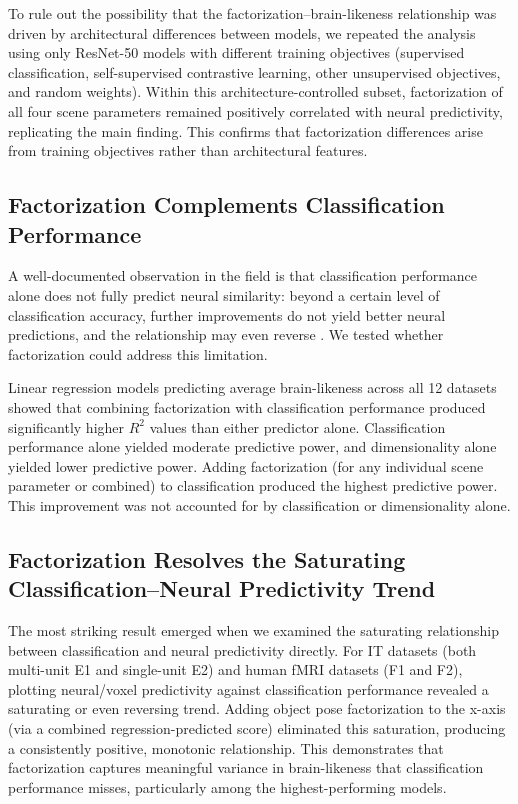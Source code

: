 \documentclass[11pt]{article}
\begin{document}
To rule out the possibility that the factorization--brain-likeness relationship was driven by architectural differences between models, we repeated the analysis using only ResNet-50 models with different training objectives (supervised classification, self-supervised contrastive learning, other unsupervised objectives, and random weights). Within this architecture-controlled subset, factorization of all four scene parameters remained positively correlated with neural predictivity, replicating the main finding. This confirms that factorization differences arise from training objectives rather than architectural features.

\subsection{Factorization Complements Classification Performance}

A well-documented observation in the field is that classification performance alone does not fully predict neural similarity: beyond a certain level of classification accuracy, further improvements do not yield better neural predictions, and the relationship may even reverse \citep{schrimpf2018}. We tested whether factorization could address this limitation.

Linear regression models predicting average brain-likeness across all 12 datasets showed that combining factorization with classification performance produced significantly higher $R^2$ values than either predictor alone. Classification performance alone yielded moderate predictive power, and dimensionality alone yielded lower predictive power. Adding factorization (for any individual scene parameter or combined) to classification produced the highest predictive power. This improvement was not accounted for by classification or dimensionality alone.

\subsection{Factorization Resolves the Saturating Classification--Neural Predictivity Trend}

The most striking result emerged when we examined the saturating relationship between classification and neural predictivity directly. For IT datasets (both multi-unit E1 and single-unit E2) and human fMRI datasets (F1 and F2), plotting neural/voxel predictivity against classification performance revealed a saturating or even reversing trend. Adding object pose factorization to the x-axis (via a combined regression-predicted score) eliminated this saturation, producing a consistently positive, monotonic relationship. This demonstrates that factorization captures meaningful variance in brain-likeness that classification performance misses, particularly among the highest-performing models.
\end{document}
